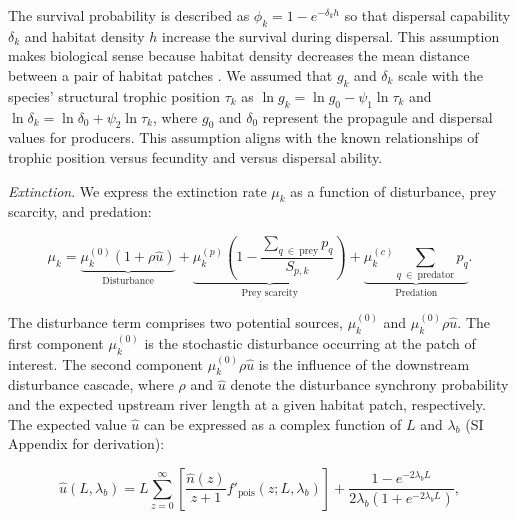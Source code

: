 \documentclass[11pt, class=article, crop=false]{standalone}
\begin{document}
The survival probability is described as $\phi_k = 1 - e^{-\delta_k h}$ so that dispersal capability $\delta_k$ and habitat density $h$ increase the survival during dispersal.
This assumption makes biological sense because habitat density decreases the mean distance between a pair of habitat patches \citep{terui_spatial_2019}.
We assumed that $g_k$ and $\delta_k$ scale with the species' structural trophic position $\tau_k$ as $\ln g_k = \ln g_0 - \psi_1 \ln \tau_k$ and $\ln \delta_k = \ln \delta_0 + \psi_2 \ln \tau_k$, where $g_0$ and $\delta_0$ represent the propagule and dispersal values for producers.
This assumption aligns with the known relationships of trophic position versus fecundity and versus dispersal ability.

\textit{Extinction}. We express the extinction rate $\mu_k$ as a function of disturbance, prey scarcity, and predation:

\begin{equation}
    \mu_{k} = 
        \underbrace{\mu_{k}^{(0)} (1 + \rho \hat{u})}_{\text{Disturbance}} + 
        \underbrace{\mu_{k}^{(p)} \left(1 - \frac{\sum_{q~\in~\text{prey}} p_{q}}{S_{p, k}} \right)}_{\text{Prey scarcity}} + 
        \underbrace{\mu_{k}^{(c)} \sum_{q~\in~\text{predator}} p_{q}}_{\text{Predation}}.
    \label{eq:extn}    
\end{equation}

The disturbance term comprises two potential sources, $\mu^{(0)}_k$ and $\mu^{(0)}_k \rho \hat{u}$.
The first component $\mu^{(0)}_k$ is the stochastic disturbance occurring at the patch of interest.
The second component $\mu^{(0)}_k \rho \hat{u}$ is the influence of the downstream disturbance cascade, where $\rho$ and $\hat{u}$ denote the disturbance synchrony probability and the expected upstream river length at a given habitat patch, respectively.
The expected value $\hat{u}$ can be expressed as a complex function of $L$ and $\lambda_b$ (SI Appendix for derivation):

\begin{equation}
    \hat{u}(L, \lambda_b) = L \sum_{z = 0}^{\infty} \left[ \frac{\hat{n}(z)}{z + 1} f'_{\text{pois}}(z; L, \lambda_b)\right] + \frac{1 - e^{-2 \lambda_b L}}{2 \lambda_b (1 + e^{-2 \lambda_b L})},
\end{equation}
\end{document}
